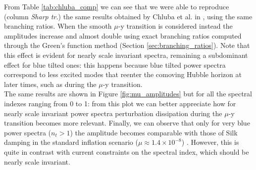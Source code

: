 From Table \ref{tab:chluba_comp} we can see that we were able to reproduce (column \emph{Sharp tr.}) the same results obtained by Chluba et al. in \cite{Chluba_tens_diss}, using the same branching ratios. When the smooth $\mu$-y transition is considered instead the amplitudes increase and almost double using exact branching ratios computed through the Green's function method (Section \ref{sec:branching_ratios}). Note that this effect is evident for nearly scale invariant spectra, remaining a subdominant effect for blue tilted ones: this happens because blue tilted power spectra correspond to less excited modes that reenter the comoving Hubble horizon at later times, such as during the $\mu$-y transition.\\ The same results are shown in Figure \ref{fig:mu_amplitudes} but for all the spectral indexes ranging from 0 to 1: from this plot we can better appreciate how for nearly scale invariant power spectra perturbation dissipation during the $\mu$-y transition becomes more relevant. Finally, we can observe that only for very blue power spectra ($n_t>1$) the amplitude becomes comparable with those of Silk damping in the standard inflation scenario ($\mu\approx1.4\times10^{-8}$) \cite{Chluba_2x2}. However, this is quite in contrast with current constraints on the spectral index, which should be nearly scale invariant.

